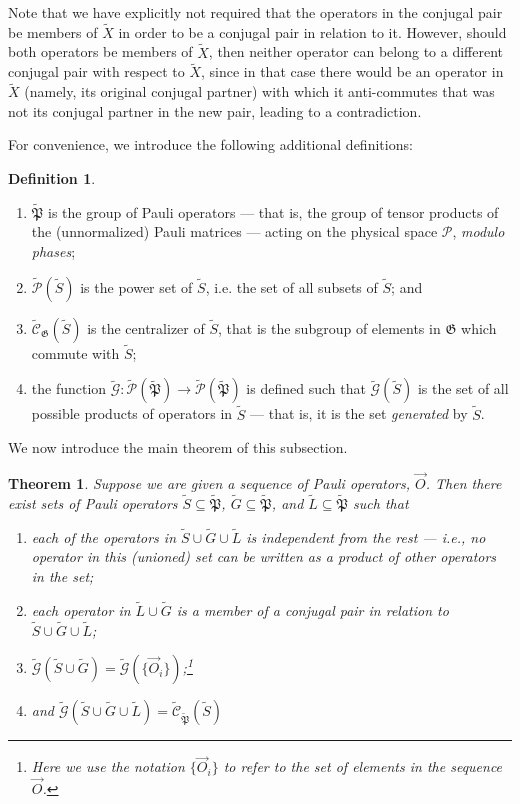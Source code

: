 \documentclass[12pt]{amsbook}
\theoremstyle{plain}
\newtheorem{theorem}{Theorem}
\theoremstyle{definition}
\newtheorem{definition}{Definition}
\theoremstyle{remark}
\newcommand{\lst}{\vec}
\newcommand{\set}{\tilde}
\newcommand{\genfun}{\tilde{\mathcal{G}}}
\newcommand{\pauligroup}{{\set{\mathfrak{P}}}}
\newcommand{\powerset}{\set{\mathcal{P}}}
\newcommand{\centralizer}{\set{\mathcal{C}}}
\newcommand{\paren}[1]{\left(#1\right)}
\begin{document}
Note that we have explicitly not required that the operators in the conjugal pair be members of $\set X$ in order to be a conjugal pair in relation to it.  However, should both operators be members of $\set X$, then neither operator can belong to a different conjugal pair with respect to $\set X$, since in that case there would be an operator in $\set X$ (namely, its original conjugal partner) with which it anti-commutes that was not its conjugal partner in the new pair, leading to a contradiction.

For convenience, we introduce the following additional definitions:

\begin{definition}

\begin{enumerate}
\item $\pauligroup$ is the group of Pauli operators --- that is, the group of tensor products of the (unnormalized) Pauli matrices --- acting on the physical space $\mathscr{P}$, \emph{modulo phases};
\item $\powerset(\set{S})$ is the power set of $\set S$, i.e. the set of all subsets of $\set S$; and
\item $\centralizer_\mathfrak{G}(\set S)$ is the centralizer of $\set S$, that is the subgroup of elements in $\mathfrak{G}$ which commute with $\set S$;
\item the function $\genfun:\powerset(\pauligroup)\to\powerset(\pauligroup)$ is defined such that $\genfun(\set S)$ is the set of all possible products of operators in $\set S$ --- that is, it is the set \emph{generated} by $\set S$.
\end{enumerate}

\end{definition}

We now introduce the main theorem of this subsection.

\begin{theorem} \label{theorem-SG} Suppose we are given a sequence of Pauli operators, $\lst O$.  Then there exist sets of Pauli operators $\set S\subseteq\pauligroup$, $\set G\subseteq\pauligroup$, and $\set L\subseteq\pauligroup$ such that
\begin{enumerate}
\item each of the operators in $\set S \cup \set G \cup \set L$ is independent from the rest --- i.e., no operator in this (unioned) set can be written as a product of other operators in the set;
\item each operator in $\set L \cup \set G$ is a member of a conjugal pair in relation to $\set S \cup \set G \cup \set L$;
\item $\genfun(\set S \cup \set G)=\genfun\paren{\{\lst O_i\}}$;\footnote{Here we use the notation $\{\vec{O}_i\}$ to refer to the set of elements in the sequence $\vec{O}$.}
\item and $\genfun(\set S \cup \set G \cup \set L)=\centralizer_\pauligroup(\set S )$
\end{enumerate}
\end{theorem}
\end{document}
